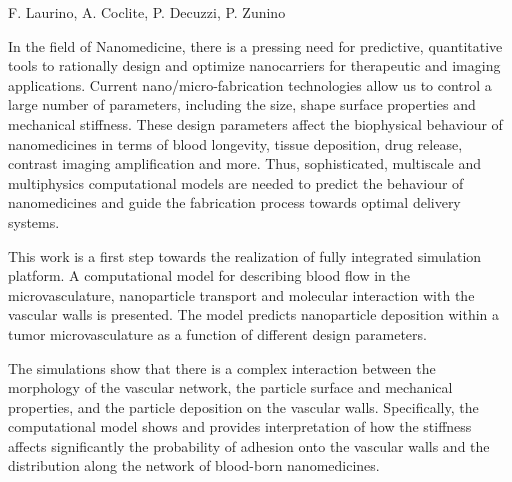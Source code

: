 \documentclass{article}
\begin{document}
{F. Laurino, A. Coclite, P. Decuzzi, P. Zunino}{}
{In the field of Nanomedicine, there is a pressing need for predictive, quantitative tools
to rationally design and optimize nanocarriers for therapeutic and imaging applications.
Current nano/micro-fabrication technologies allow us to control a large number of parameters,
including the size, shape surface properties and mechanical stiffness. These design parameters
affect the biophysical behaviour of nanomedicines in terms of blood longevity, tissue deposition,
drug release, contrast imaging amplification and more. Thus, sophisticated, multiscale and multiphysics
computational models are needed to predict the behaviour of nanomedicines and guide the fabrication
process towards optimal delivery systems.

This work is a first step towards the realization of fully integrated simulation platform.
A computational model for describing blood flow in the microvasculature, nanoparticle
transport and molecular interaction with the vascular walls is presented. The model predicts
nanoparticle deposition within a tumor microvasculature as a function of different design parameters.

The simulations show that there is a complex interaction between the morphology of the vascular network,
the particle surface and mechanical properties, and the particle deposition on the vascular walls.
Specifically, the computational model shows and provides interpretation of how the stiffness
affects significantly the probability of adhesion onto the vascular walls and the distribution
along the network of blood-born nanomedicines.}
\end{document}
